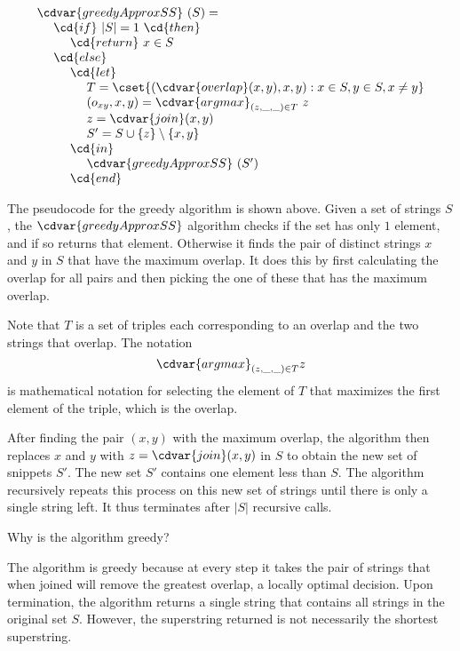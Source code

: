\begin{algorithm}
\label{alg:genome::alg::greedySS}
\[
\begin{array}{l}
\cdvar{greedyApproxSS}~(S) = 
\\
~~~~\cd{if}~|S| = 1~\cd{then}
\\ 
~~~~~~~~\cd{return}~x \in S
\\
~~~~\cd{else}
\\
~~~~~~~~\cd{let}
\\
~~~~~~~~~~~~T = \cset{(\cdvar{overlap}(x, y), x, y) : x \in S, y \in S, x \neq
  y}
\\
~~~~~~~~~~~~(o_{xy}, x, y) = \cdvar{argmax}_{(z, \_, \_) \in T} ~z
\\
~~~~~~~~~~~~z = \cdvar{join} (x, y)
\\
~~~~~~~~~~~~S' = S \cup \{z\} \setminus \{x,y\}
\\
~~~~~~~~\cd{in}
\\
~~~~~~~~~~~~\cdvar{greedyApproxSS}~(S')
\\
~~~~~~~~\cd{end}
\end{array}
\] 


The pseudocode for the greedy algorithm is shown above.
%
Given a set of strings $S$, the $\cdvar{greedyApproxSS}$ algorithm
checks if the set has only $1$ element, and if so returns that element.
%
Otherwise it finds the pair of distinct strings $x$ and $y$ in $S$
that have the maximum overlap.  It does this by first calculating the
overlap for all pairs and then picking the one of these that has the
maximum overlap.
%

Note that $T$ is a set of triples each corresponding to an overlap and
the two strings that overlap.  The notation 
\[
\cdvar{argmax}_{(z, \_, \_) \in T} z
\]
is mathematical notation for selecting the element of $T$ that
maximizes the first element of the triple, which is the overlap.
%

After finding the pair $(x,y)$ with the maximum overlap, the
algorithm then replaces $x$ and $y$ with $z = \cdvar{join}(x,y)$
in $S$ to obtain the new set of snippets $S'$.
%
The new set $S'$ contains one element less than $S$.
%
The algorithm recursively repeats this process on this new set of
strings until there is only a single string left.  It thus terminates
after $|S|$ recursive calls.
\end{algorithm}



\begin{flex}
\begin{exercise}
Why is the algorithm greedy?
\end{exercise}

\begin{solution}
The algorithm is greedy because at every step it takes the pair of
strings that when joined will remove the greatest overlap, a locally
optimal decision.  Upon termination, the algorithm returns a single
string that contains all strings in the original set $S$.  However,
the superstring returned is not necessarily the shortest superstring.
\end{solution}
\end{flex}

